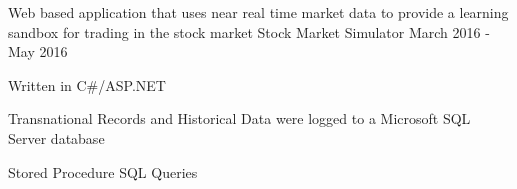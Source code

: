 \begin{cventries}
  \cventry
    {Web based application that uses near real time market data to provide a learning sandbox for trading in the stock market} %
    {Stock Market Simulator} %
    {} %
    {March 2016 - May 2016} %
    {
      \begin{cvitems} %
        \item {Written in C\#/ASP.NET}
        \item {Transnational Records and Historical Data were logged to a Microsoft SQL Server database}
        \item {Stored Procedure SQL Queries}
      \end{cvitems}
    }

\end{cventries}
